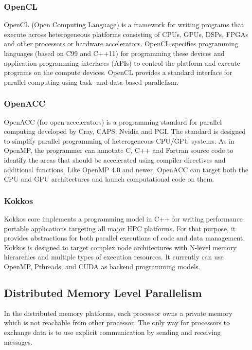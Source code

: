 \subsubsection{OpenCL}

OpenCL (Open Computing Language) is a framework for writing programs that execute across heterogeneous platforms consisting of CPUs, GPUs, DSPs, FPGAs and other processors or hardware accelerators. OpenCL specifies programming languages (based on C99 and C++11) for programming these devices and application programming interfaces (APIs) to control the platform and execute programs on the compute devices. OpenCL provides a standard interface for parallel computing using task- and data-based parallelism.

\subsubsection{OpenACC}

OpenACC (for open accelerators) is a programming standard for parallel computing developed by Cray, CAPS, Nvidia and PGI. The standard is designed to simplify parallel programming of heterogeneous CPU/GPU systems. As in OpenMP, the programmer can annotate C, C++ and Fortran source code to identify the areas that should be accelerated using compiler directives and additional functions. Like OpenMP 4.0 and newer, OpenACC can target both the CPU and GPU architectures and launch computational code on them.

\subsubsection{Kokkos}

Kokkos \cite{edwards2014kokkos} core implements a programming model in C++ for writing performance portable applications targeting all major HPC platforms. For that purpose, it provides abstractions for both parallel executions of code and data management. Kokkos is designed to target complex node architectures with N-level memory hierarchies and multiple types of execution resources. It currently can use OpenMP, Pthreads, and CUDA as backend programming models.


\subsection{Distributed Memory Level Parallelism}

In the distributed memory platforms, each processor owns a private memory which is not reachable from other processor. The only way for processors to exchange data is to use explicit communication by sending and receiving messages. 


